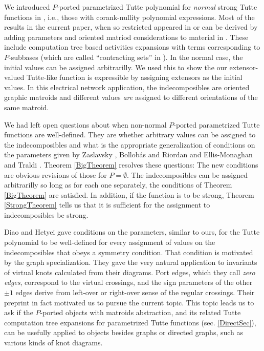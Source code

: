 \documentclass[12pt,leqno]{amsart}
\theoremstyle{remark}
\begin{document}
We introduced $P$-ported parametrized Tutte polynomial 
for \emph{normal} strong Tutte functions
in \cite{TutteEx}, i.e., 
those with
corank-nullity polynomial expressions.
Most of the results in the current paper, when so restricted
appeared in \cite{TutteEx}
or can be derived by adding parameters and oriented matriod considerations
to material in \cite{sdcPorted}.  
These include computation tree\cite{GordonMcMachonGreedoid} based activities 
expansions 
with terms corresponding to $P$-subbases (which are called
``contracting sets'' in \cite{RelTuttePoly}).
In the normal case, the initial values can be assigned arbitrarilly.
We used this to show the our extensor-valued Tutte-like function 
\cite{sdcPorted} is expressible
by assigning extensors as the initial values.  In this
electrical network application, the indecomposibles are oriented 
graphic matroids
and different values \emph{are} assigned to different orientations of
the same matroid.  

We had left open questions about
when non-normal $P$-ported parametrized Tutte
functions are well-defined.  They are 
whether arbitrary
values can be assigned to the indecomposibles and what is
the appropriate generalization of
conditions on the parameters given by Zaslavsky \cite{MR93a:05047},
Bollob\'{a}s and Riordan \cite{BollobasRiordanTuttePolyColored} and 
Ellis-Monaghan and Traldi \cite{Ellis-Monaghan-Traldi}.
Theorem \ref{BigTheorem} resolves these questions:  The new conditions 
are obvious revisions of those for $P=\emptyset$.  The indecomposibles
can be assigned arbitrarilly so long as for each one separately,
the conditions of Theorem \ref{BigTheorem} are satisfied.  In addition,
if the function is to be strong, Theorem \ref{StrongTheorem}
tells us that it is sufficient for the assignment to
indecomposibles be strong.


Diao and Hetyei gave conditions on the parameters, similar to ours, for the
Tutte polynomial to be well-defined for every assignment of
values on the indecomposibles that obeys a symmetry condition.
That condition is motivated by the graph specialization.  
They gave the very natural application to invariants of 
virtual knots calculated
from their diagrams.
Port edges, which they call 
\emph{zero edges}, correspond to the 
virtual crossings, and the sign parameters of the other 
$\pm 1$ edges derive from left-over or right-over
sense of the regular crossings.  Their preprint in fact motivated
us to pursue the current topic\cite{RelTuttePoly}.  This topic
leads us to ask if the $P$-ported objects with matroids abstraction, 
and its related Tutte computation tree expansions for parametrized
Tutte functions (sec. \ref{DirectSec}), can be usefully
applied to objects besides graphs or directed graphs, such
as various kinds of knot diagrams.
\end{document}
